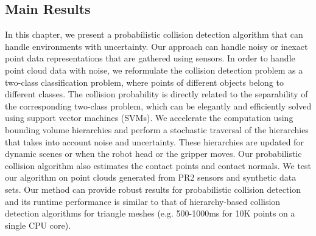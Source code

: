 \subsection{Main Results}
In this chapter, we present a probabilistic collision detection algorithm that can handle environments with uncertainty.
Our approach can handle noisy or inexact point data representations that are gathered using sensors.
In order to handle point cloud data with noise, we reformulate the collision detection problem as a two-class classification problem,
where points of different objects belong to different classes. The collision probability is directly related to the separability of the corresponding
two-class problem, which can be elegantly and efficiently solved using support vector machines (SVMs).
We accelerate the computation using bounding volume hierarchies and perform a stochastic traversal of the hierarchies that takes into account noise and
uncertainty. These hierarchies are updated for dynamic scenes or when the robot head or the gripper moves.
Our probabilistic collision algorithm also estimates the contact points and contact normals.
We test our algorithm on point clouds generated from PR2 sensors and synthetic data sets. Our method can provide robust results for probabilistic collision detection and its runtime performance is similar to that of hierarchy-based collision detection algorithms for triangle meshes (e.g. 500-1000ms for 10K points on a single CPU core).



